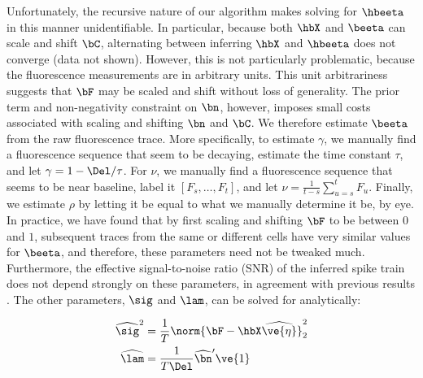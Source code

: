 \documentclass[12pt]{article}
\newcommand{\hnm}{\widehat{\bn}}
\begin{document}
Unfortunately, the recursive nature of our algorithm makes solving for $\hbeeta$ in this manner unidentifiable. In particular, because both $\hbX$ and $\beeta$ can scale and shift $\bC$, alternating between inferring $\hbX$ and $\hbeeta$ does not converge (data not shown). However, this is not particularly problematic, because the fluorescence measurements are in arbitrary units. This unit arbitrariness suggests that $\bF$ may be scaled and shift without loss of generality. The prior term and non-negativity constraint on $\bn$, however, imposes small costs associated with scaling and shifting $\bn$ and $\bC$.  We therefore estimate $\beeta$ from the raw fluorescence trace.  More specifically, to estimate $\gamma$, we manually find a fluorescence sequence that seem to be decaying, estimate the time constant $\tau$, and let $\gamma=1-\Del/\tau$.  For $\nu$, we manually find a fluorescence sequence that seems to be near baseline, label it $[F_s,\ldots, F_t]$, and let $\nu=\frac{1}{t-s}\sum_{u=s}^t F_u$.  Finally, we estimate $\rho$ by letting it be equal to what we manually determine it be, by eye.  In practice, we have found that by first scaling and shifting $\bF$ to be between $0$ and $1$, subsequent traces from the same or different cells have very similar values for $\beeta$, and therefore, these parameters need not be tweaked much.  Furthermore, the effective signal-to-noise ratio (SNR) of the inferred spike train does not depend strongly on these parameters, in agreement with previous results \cite{YaksiFriedrich06}.  The other parameters, $\sig$ and $\lam$, can be solved for analytically:

\begin{align} 
\widehat{\sig}^2 &= \frac{1}{T} \norm{\bF - \hbX \widehat{\ve{\eta}}}_2^2 \label{eq:sig}\\
\widehat{\lam} &=  \frac{1}{T \Del} \hnm' \ve{1} \label{eq:lam}
\end{align}

\end{document}
